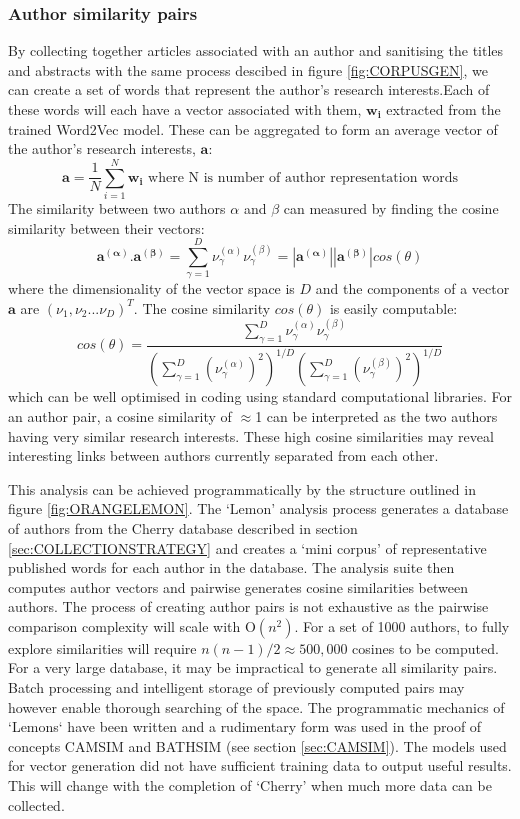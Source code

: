 \documentclass[11pt, oneside]{article}   	%
\begin{document}
\subsubsection{Author similarity pairs}
\label{sec:LEMON}
By collecting together articles associated with an author and sanitising the titles and abstracts with the same process descibed in figure \ref{fig:CORPUSGEN}, we can create a set of words that represent the author's research interests.Each of these words will each have a vector associated with them, $\mathbf{w_i}$ extracted from the trained Word2Vec model. These can be aggregated to form an average vector of the author's research interests, $\mathbf{a}$:
$$\mathbf{a} =  \frac{1}{N}\displaystyle\sum_{i=1}^{N} \mathbf{w_i} \mbox{ where N is number of author representation words}$$
The similarity between two authors $\alpha$ and $\beta$ can measured by finding the cosine similarity between their vectors:
$$\mathbf{a^{(\alpha)}}.\mathbf{a^{(\beta)}}=\displaystyle\sum_{\gamma=1}^{D} \nu^{(\alpha)}_{\gamma}\nu^{(\beta)}_{\gamma} = |\mathbf{a^{(\alpha)}}||\mathbf{a^{(\beta)}}|cos(\theta) $$
where the dimensionality of the vector space is $D$ and the components of a vector $\mathbf{a}$ are $(\nu_1,\nu_2...\nu_D)^T$. The cosine similarity $cos(\theta)$ is easily computable:
$$cos(\theta)= \frac{\displaystyle\sum_{\gamma=1}^{D} \nu^{(\alpha)}_{\gamma}\nu^{(\beta)}_{\gamma}}{\left(\displaystyle\sum_{\gamma=1}^{D} (\nu^{(\alpha)}_{\gamma})^2\right)^{1/D} \left(\displaystyle\sum_{\gamma=1}^{D} (\nu^{(\beta)}_{\gamma})^2\right)^{1/D}}$$
which can be well optimised in coding using standard computational libraries.
For an author pair, a cosine similarity of $\approx$1 can be interpreted as the two authors having very similar research interests. These high cosine similarities may reveal interesting links between authors currently separated from each other.

This analysis can be achieved programmatically by the structure outlined in figure \ref{fig:ORANGELEMON}. The `Lemon' analysis process generates a database of authors from the Cherry database described in section \ref{sec:COLLECTIONSTRATEGY} and creates a `mini corpus' of representative published words for each author in the database. The analysis suite then computes author vectors and pairwise generates cosine similarities between authors. The process of creating author pairs is not exhaustive as the pairwise comparison complexity will scale with O$(n^2)$. For a set of 1000 authors, to fully explore similarities will require $n(n-1)/2 \approx 500,000$ cosines to be computed. For a very large database, it may be impractical to generate all similarity pairs. Batch processing and intelligent storage of previously computed pairs may however enable thorough searching of the space. The programmatic mechanics of `Lemons` have been written and a rudimentary form was used in the proof of concepts CAMSIM and BATHSIM (see section \ref{sec:CAMSIM}). The models used for vector generation did not have sufficient training data to output useful results. This will change with the completion of `Cherry' when much more data can be collected. 
\end{document}

